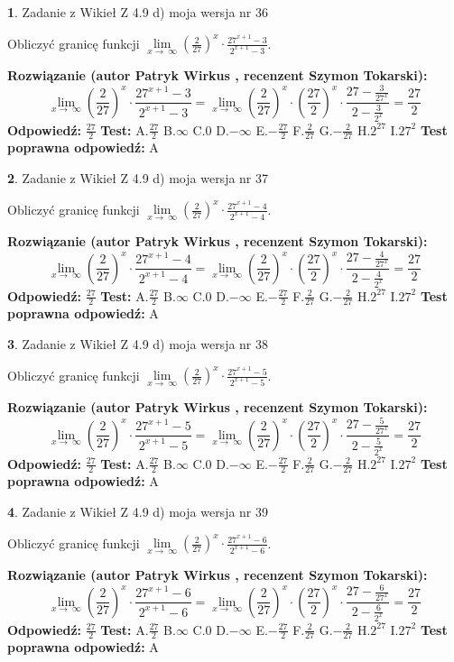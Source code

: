 \documentclass[12pt, a4paper]{article}
\theoremstyle{definition} %
\newtheorem{zad}{}
\newcommand{\zadStart}[1]{\begin{zad}#1\newline}
\newcommand{\zadStop}{\end{zad}}
\newcommand{\rozwStart}[2]{\noindent \textbf{Rozwiązanie (autor #1 , recenzent #2): }\newline}
\newcommand{\rozwStop}{\newline}
\newcommand{\odpStart}{\noindent \textbf{Odpowiedź:}\newline}
\newcommand{\odpStop}{\newline}
\newcommand{\testStart}{\noindent \textbf{Test:}\newline}
\newcommand{\testStop}{\newline}
\newcommand{\kluczStart}{\noindent \textbf{Test poprawna odpowiedź:}\newline}
\newcommand{\kluczStop}{\newline}
\begin{document}
\zadStart{Zadanie z Wikieł Z 4.9 d) moja wersja nr 36}


Obliczyć granicę funkcji  $\lim\limits_{x\to\ \infty}(\frac{2}{27})^{x}\cdot\frac{27^{x+1}-3}{2^{x+1}-3}$.
\zadStop
\rozwStart{Patryk Wirkus}{Szymon Tokarski}
$$\lim\limits_{x\to\ \infty}(\frac{2}{27})^{x}\cdot\frac{27^{x+1}-3}{2^{x+1}-3}=\lim\limits_{x\to\ \infty}(\frac{2}{27})^{x}\cdot(\frac{27}{2})^{x} \cdot \frac{27-\frac{3}{27^{x}}}{2-\frac{3}{2^{x}}} = \frac{27}{2}$$
\rozwStop
\odpStart
$\frac{27}{2}$
\odpStop
\testStart
A.$\frac{27}{2}$ B.$\infty$ C.$0$ D.$-\infty$ E.$-\frac{27}{2}$
F.$\frac{2}{27}$ G.$-\frac{2}{27}$
H.$2^{27}$
I.$27^{2}$
\testStop
\kluczStart
A
\kluczStop



\zadStart{Zadanie z Wikieł Z 4.9 d) moja wersja nr 37}


Obliczyć granicę funkcji  $\lim\limits_{x\to\ \infty}(\frac{2}{27})^{x}\cdot\frac{27^{x+1}-4}{2^{x+1}-4}$.
\zadStop
\rozwStart{Patryk Wirkus}{Szymon Tokarski}
$$\lim\limits_{x\to\ \infty}(\frac{2}{27})^{x}\cdot\frac{27^{x+1}-4}{2^{x+1}-4}=\lim\limits_{x\to\ \infty}(\frac{2}{27})^{x}\cdot(\frac{27}{2})^{x} \cdot \frac{27-\frac{4}{27^{x}}}{2-\frac{4}{2^{x}}} = \frac{27}{2}$$
\rozwStop
\odpStart
$\frac{27}{2}$
\odpStop
\testStart
A.$\frac{27}{2}$ B.$\infty$ C.$0$ D.$-\infty$ E.$-\frac{27}{2}$
F.$\frac{2}{27}$ G.$-\frac{2}{27}$
H.$2^{27}$
I.$27^{2}$
\testStop
\kluczStart
A
\kluczStop



\zadStart{Zadanie z Wikieł Z 4.9 d) moja wersja nr 38}


Obliczyć granicę funkcji  $\lim\limits_{x\to\ \infty}(\frac{2}{27})^{x}\cdot\frac{27^{x+1}-5}{2^{x+1}-5}$.
\zadStop
\rozwStart{Patryk Wirkus}{Szymon Tokarski}
$$\lim\limits_{x\to\ \infty}(\frac{2}{27})^{x}\cdot\frac{27^{x+1}-5}{2^{x+1}-5}=\lim\limits_{x\to\ \infty}(\frac{2}{27})^{x}\cdot(\frac{27}{2})^{x} \cdot \frac{27-\frac{5}{27^{x}}}{2-\frac{5}{2^{x}}} = \frac{27}{2}$$
\rozwStop
\odpStart
$\frac{27}{2}$
\odpStop
\testStart
A.$\frac{27}{2}$ B.$\infty$ C.$0$ D.$-\infty$ E.$-\frac{27}{2}$
F.$\frac{2}{27}$ G.$-\frac{2}{27}$
H.$2^{27}$
I.$27^{2}$
\testStop
\kluczStart
A
\kluczStop



\zadStart{Zadanie z Wikieł Z 4.9 d) moja wersja nr 39}


Obliczyć granicę funkcji  $\lim\limits_{x\to\ \infty}(\frac{2}{27})^{x}\cdot\frac{27^{x+1}-6}{2^{x+1}-6}$.
\zadStop
\rozwStart{Patryk Wirkus}{Szymon Tokarski}
$$\lim\limits_{x\to\ \infty}(\frac{2}{27})^{x}\cdot\frac{27^{x+1}-6}{2^{x+1}-6}=\lim\limits_{x\to\ \infty}(\frac{2}{27})^{x}\cdot(\frac{27}{2})^{x} \cdot \frac{27-\frac{6}{27^{x}}}{2-\frac{6}{2^{x}}} = \frac{27}{2}$$
\rozwStop
\odpStart
$\frac{27}{2}$
\odpStop
\testStart
A.$\frac{27}{2}$ B.$\infty$ C.$0$ D.$-\infty$ E.$-\frac{27}{2}$
F.$\frac{2}{27}$ G.$-\frac{2}{27}$
H.$2^{27}$
I.$27^{2}$
\testStop
\kluczStart
A
\kluczStop
\end{document}
